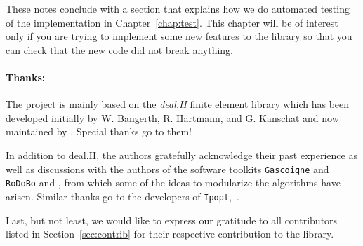 These notes conclude with a section that explains how we do automated testing of the 
implementation in Chapter~\ref{chap:test}. This chapter will be of interest only if you 
are trying to implement some new features to the library so that you can check that 
the new code did not break anything.

\paragraph{Thanks:}
The \dope{} project is 
mainly based on the \textit{deal.II} finite element library which has been developed
 initially by W. Bangerth, R. Hartmann, and G. Kanschat \cite{deal} and 
now maintained by \cite{deal2}. Special thanks go to them!

In addition to deal.II, the authors 
gratefully acknowledge their past experience as well as discussions with 
the authors of  
the software toolkits \texttt{Gascoigne} and \texttt{RoDoBo}
\cite{Gascoigne} and \cite{rodobo-web}, 
from which some of the ideas to modularize the algorithms have arisen.
Similar thanks go to the developers of \texttt{Ipopt},~\cite{ipopt}.


Last, but not least, we would like to express our gratitude 
to all contributors listed in Section~\ref{sec:contrib}
for their respective contribution to the library.

 

%
%
%
%






